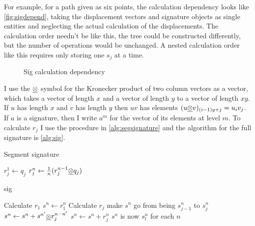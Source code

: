 For example, for a path given as six points, the calculation dependency looks like \autoref{fig:sigdepend}, taking the displacement vectors and signature objects as single entities and neglecting the actual calculation of the displacements. The calculation order needn't be like this, the tree could be constructed differently, but the number of operations would be unchanged. A nested calculation order like this requires only storing one $s_j$ at a time.
\begin{figure}[h]
\begin{center}
\end{center}
\caption{Sig calculation dependency}\label{fig:sigdepend}
\end{figure}

I use the $\underline{\otimes}$ symbol for the Kronecker product of two column vectors as a vector, which takes a vector of length $x$ and a vector of length $y$ to a vector of length $xy$.
If $u$ has length $x$ and $v$ has length $y$ then $uv$ has elements $(u\underline{\otimes} v)_{(i-1)y+j}=u_iv_j$.
If $a$ is a signature, then I write $a^m$ for the vector of its elements at level $m$.
To calculate $r_j$ I use the procedure in \autoref{alg:segsignature} and the algorithm for the full signature is \autoref{alg:sig}.
\begin{algorithm}\caption{Segment signature\label{alg:segsignature}}
\begin{algorithmic}[1]
	\State $r_j^1\gets q_j$
	\State $r_j^n\gets \frac1{n}(r_j^{n-1}\underline{\otimes} q_j)$
	\EndFor
\end{algorithmic}
\end{algorithm}
\begin{algorithm}\caption{sig\label{alg:sig}}
\begin{algorithmic}[1]
	\State Calculate $r_1$
	\State $s^n\gets r_1^n$
	\EndFor
	\State Calculate $r_j$
		\Comment make $s^n$ go from being $s^n_{j-1}$ to $s^n_j$
	\State $s^{n}\gets s^{n}+s^{n'}\underline{\otimes} r_j^{n-n'}$
	\EndFor
	\State $s^{n}\gets s^{n}+r_j^n$
	\EndFor
	\EndFor
	\State $s^{n}$ is now $s_l^n$ for each $n$
\end{algorithmic}
\end{algorithm}

